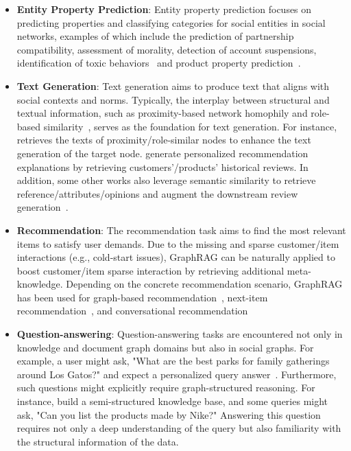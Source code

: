 \begin{itemize}[leftmargin=*]
    \item \textbf{Entity Property Prediction}: 
    Entity property prediction focuses on predicting properties and classifying categories for social entities in social networks, examples of which include the prediction of partnership compatibility, assessment of morality, detection of account suspensions, identification of toxic behaviors~\cite{jiang2023social} and product property prediction~\cite{wang2024knowledge2}.


    \item \textbf{Text Generation}: 
    Text generation aims to produce text that aligns with social contexts and norms. Typically, the interplay between structural and textual information, such as proximity-based network homophily and role-based similarity~\cite{ahmed2018learning}, serves as the foundation for text generation. For instance, \citet{wang2024augmenting} retrieves the texts of proximity/role-similar nodes to enhance the text generation of the target node. \citet{kim2020retrieval, xie2023factual} generate personalized recommendation explanations by retrieving customers'/products' historical reviews. In addition, some other works also leverage semantic similarity to retrieve reference/attributes/opinions and augment the downstream review generation~\cite{sharma2018cyclegen, dong2017learning, park2015retrieval}.
    
    

    \item \textbf{Recommendation}:
    The recommendation task aims to find the most relevant items to satisfy user demands. Due to the missing and sparse customer/item interactions (e.g., cold-start issues), GraphRAG can be naturally applied to boost customer/item sparse interaction by retrieving additional meta-knowledge. Depending on the concrete recommendation scenario, GraphRAG has been used for graph-based recommendation~\cite{wei2024llmrec, du2024large}, next-item recommendation~\cite{wang2024knowledge2, huang2021graph, zhang2021learning, qiu2020exploiting, zeng2024federated, wang2023zero}, and conversational recommendation~\cite{friedman2023leveraging}
    
    
    
    \item \textbf{Question-answering}: Question-answering tasks are encountered not only in knowledge and document graph domains but also in social graphs. For example, a user might ask, "What are the best parks for family gatherings around Los Gatos?" and expect a personalized query answer~\cite{zeng2024large, kemper2024retrieval}. Furthermore, such questions might explicitly require graph-structured reasoning. For instance, \citet{wu2024stark} build a semi-structured knowledge base, and some queries might ask, "Can you list the products made by Nike?" Answering this question requires not only a deep understanding of the query but also familiarity with the structural information of the data.



\end{itemize}
